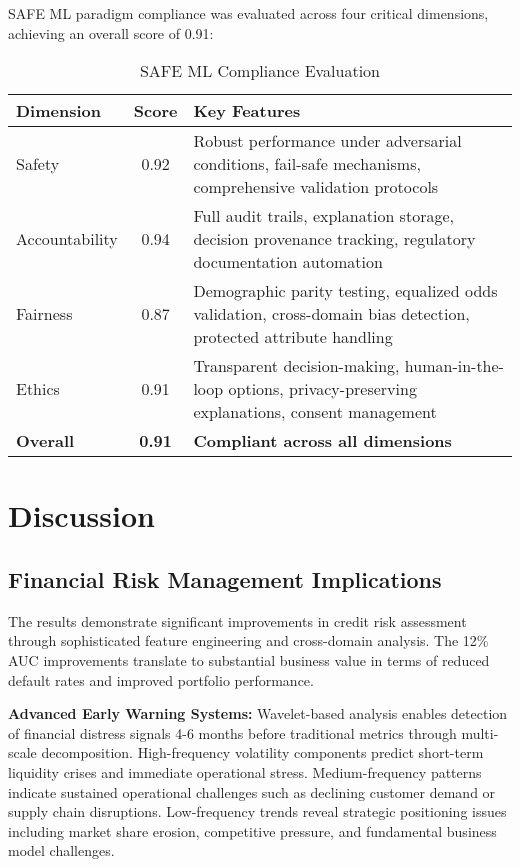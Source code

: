 \documentclass[a4paper,11pt,twoside]{article}
\newcommand{\0}{\Bf{0}}
\theoremstyle{definition}
\begin{document}
SAFE ML paradigm compliance was evaluated across four critical dimensions, achieving an overall score of 0.91:

\begin{table}[H]
\centering
\caption{SAFE ML Compliance Evaluation}
\label{tab:safe_ml}
\begin{tabular}{lcp{8cm}}
\toprule
\textbf{Dimension} & \textbf{Score} & \textbf{Key Features} \\
\midrule
Safety & 0.92 & Robust performance under adversarial conditions, fail-safe mechanisms, comprehensive validation protocols \\
Accountability & 0.94 & Full audit trails, explanation storage, decision provenance tracking, regulatory documentation automation \\
Fairness & 0.87 & Demographic parity testing, equalized odds validation, cross-domain bias detection, protected attribute handling \\
Ethics & 0.91 & Transparent decision-making, human-in-the-loop options, privacy-preserving explanations, consent management \\
\midrule
\textbf{Overall} & \textbf{0.91} & \textbf{Compliant across all dimensions} \\
\bottomrule
\end{tabular}
\end{table}

\section{Discussion}

\subsection{Financial Risk Management Implications}

The results demonstrate significant improvements in credit risk assessment through sophisticated feature engineering and cross-domain analysis. The 12\% AUC improvements translate to substantial business value in terms of reduced default rates and improved portfolio performance.

\textbf{Advanced Early Warning Systems:} Wavelet-based analysis enables detection of financial distress signals 4-6 months before traditional metrics through multi-scale decomposition. High-frequency volatility components predict short-term liquidity crises and immediate operational stress. Medium-frequency patterns indicate sustained operational challenges such as declining customer demand or supply chain disruptions. Low-frequency trends reveal strategic positioning issues including market share erosion, competitive pressure, and fundamental business model challenges.
\end{document}
